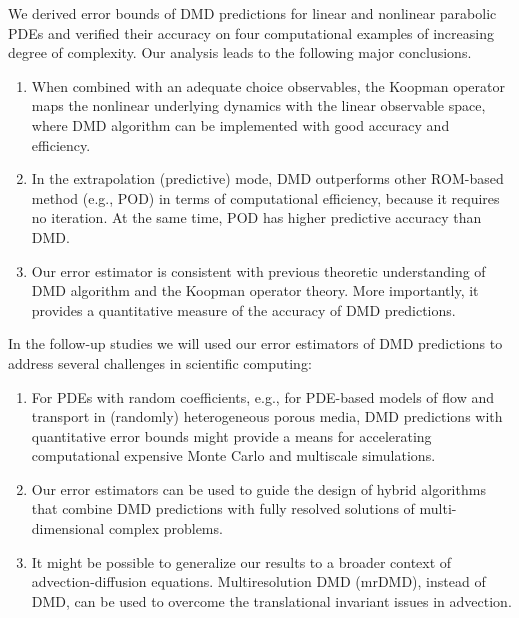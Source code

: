 \documentclass[10pt]{article}
\numberwithin{equation}{section}
\theoremstyle{plain}
\theoremstyle{remark}
\theoremstyle{remark}
\begin{document}
We derived error bounds of DMD predictions for linear and nonlinear parabolic PDEs and verified their accuracy on four computational examples of increasing degree of complexity. Our analysis leads to the following major conclusions.
\begin{enumerate}
\item When combined with an adequate choice observables, the Koopman operator maps the nonlinear underlying dynamics with the linear observable space, where DMD algorithm can be implemented with good accuracy and efficiency. 

\item In the extrapolation (predictive) mode, DMD outperforms other ROM-based method (e.g., POD) in terms of computational efficiency, because it requires no iteration. At the same time, POD has higher predictive accuracy than DMD.


\item Our error estimator is consistent with previous theoretic understanding of DMD algorithm and the Koopman operator theory. More importantly, it provides a quantitative measure of the accuracy of DMD predictions. 
\end{enumerate}
In the follow-up studies we will used  our error estimators of DMD predictions to address several challenges in scientific computing:
\begin{enumerate}
\item For PDEs with random coefficients, e.g., for PDE-based models of flow and transport in (randomly) heterogeneous porous media, DMD predictions with quantitative error bounds might provide a means for accelerating computational expensive Monte Carlo and multiscale simulations.
\item Our error estimators can be used to guide the design of hybrid algorithms that combine DMD predictions with fully resolved solutions of multi-dimensional complex problems. 

\item It might be possible to generalize our results to a broader context of advection-diffusion equations. Multiresolution DMD (mrDMD), instead of DMD, can be used to overcome the translational invariant issues in advection. %
\end{enumerate}
\end{document}
